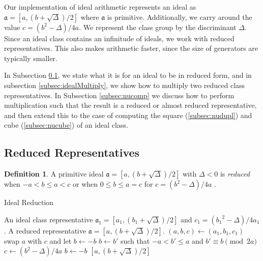 \documentclass{ucalgthes1}
\theoremstyle{plain}
\theoremstyle{definition}
\newtheorem{defn}[thm]{Definition}
\begin{document}
Our implementation of ideal arithmetic represents an ideal as $\mathfrak a = [a, (b + \sqrt\Delta)/2]$ where $\mathfrak a$ is primitive.  Additionally, we carry around the value $c = (b^2 - \Delta)/4a$.  We represent the class group by the discriminant $\Delta$. Since an ideal class contains an infinitude of ideals, we work with reduced representatives.  This also makes arithmetic faster, since the size of generators are typically smaller.

In Subsection \ref{subsec:reduction}, we state what it is for an ideal to be in reduced form, and in subsection \ref{subsec:idealMultiply}, we show how to multiply two reduced class representatives. In Subsection \ref{subsec:nucomp} we discuss how to perform multiplication such that the result is a reduced or almost reduced representative, and then extend this to the case of computing the square (\ref{subsec:nudupl}) and cube (\ref{subsec:nucube}) of an ideal class.  


\subsection{Reduced Representatives}
\label{subsec:reduction}

\begin{defn}
A primitive ideal $\mathfrak{a} = [a, (b+\sqrt{\Delta})/2]$ with $\Delta < 0$ is \emph{reduced} when $-a < b \le a < c$ or when $0 \le b \le a = c$ for $c = (b^2 - \Delta)/4a$ \cite[p.241]{Crandall2001}.
\end{defn}

\begin{algorithm}[h]
\caption{Ideal Reduction}
\label{alg:reduce}
\begin{algorithmic}[1]
\REQUIRE An ideal class representative $\mathfrak a_1 = [a_1, (b_1+\sqrt\Delta)/2]$ and $c_1 = ({b_1}^2 - \Delta)/4a_1$.
\ENSURE A reduced representative $\mathfrak a = [a, (b+\sqrt\Delta)/2]$.
\STATE $(a, b, c) \gets (a_1, b_1, c_1)$
		\STATE swap $a$ with $c$ and let $b \gets -b$
	\ENDIF
		\STATE $b \gets b'$ such that $-a < b' \le a$ and $b' \equiv b \pmod{2a}$
		\STATE $c \gets (b^2-\Delta)/4a$
	\ENDIF
\ENDWHILE
{}
	\STATE $b \gets -b$
\ENDIF
\RETURN $[a, (b+\sqrt\Delta)/2]$
\end{algorithmic}
\end{algorithm}
\end{document}
